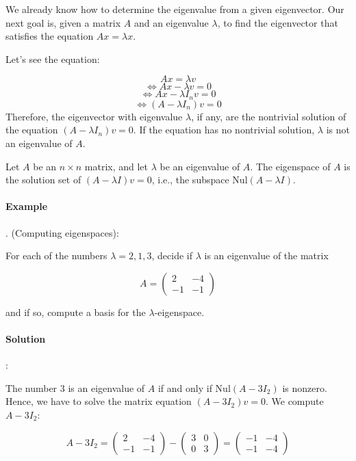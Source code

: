 \documentclass[a4paper,12pt]{article}
\begin{document}
\begin{frame}
\small

\small We already know how to determine the eigenvalue from a given eigenvector. Our next goal is, given a matrix \(A\) and an eigenvalue \(\lambda\), to find the eigenvector that satisfies the equation \(Ax = \lambda x\).

Let's see the equation:

\[
Ax=\lambda v
\]
\[
\Longleftrightarrow
Ax - \lambda v = 0
\]
\[
\Longleftrightarrow
Ax - \lambda I_n v = 0
\]
\[
\Longleftrightarrow
(A - \lambda I_n)v = 0
\]
\newpage
Therefore, the eigenvector with eigenvalue \(\lambda\), if any, are the nontrivial solution of the equation \((A-\lambda I_n)v=0\). If the equation has no nontrivial solution, \(\lambda\) is not an eigenvalue of \(A\).



\begin{tcolorbox}[title=Definition,colframe=blue!70!black, colback=blue!5!white]
Let \( A \) be an \( n \times n \) matrix, and let \( \lambda \) be an eigenvalue of \( A \). The eigenspace of \( A \) is the solution set of \( (A - \lambda I)v = 0 \), i.e., the subspace \( \text{Nul}(A - \lambda I) \).
\end{tcolorbox}
\paragraph{Example}. (Computing eigenspaces): 

For each of the numbers \( \lambda = 2, 1, 3 \), decide if \( \lambda \) is an eigenvalue of the matrix

\[
A = \begin{pmatrix}
2 & -4 \\
-1 & -1
\end{pmatrix}
\]

and if so, compute a basis for the \( \lambda \)-eigenspace.

\paragraph{Solution}: 

The number \( 3 \) is an eigenvalue of \( A \) if and only if \( \text{Nul}(A - 3I_2) \) is nonzero. Hence, we have to solve the matrix equation \( (A - 3I_2)v = 0 \). We compute \( A - 3I_2 \):

\[
A - 3I_2 = \begin{pmatrix}
2 & -4 \\
-1 & -1
\end{pmatrix} - \begin{pmatrix}
3 & 0 \\
0 & 3
\end{pmatrix}
= \begin{pmatrix}
-1 & -4 \\
-1 & -4
\end{pmatrix}
\]


\end{frame}
\end{document}
